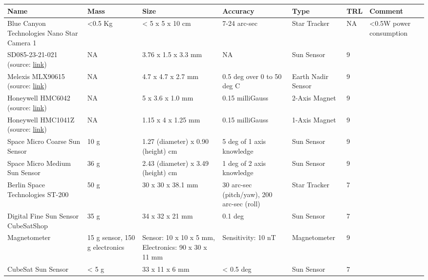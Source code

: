 \begin{center}
     \begin{tabular}{ | p{2.25cm} | p{1.25cm} | p{2cm} | p{2cm} | l | l | p{3.75cm} |}
     \hline

      {\bf Name} & {\bf Mass} & {\bf Size} & {\bf Accuracy} & {\bf Type} & {\bf TRL} & {\bf Comment}  \\ \hline

     Blue Canyon Technologies Nano Star Camera 1 \cite{BCT} & <0.5 Kg& < 5 x 5 x 10 cm & 7-24 arc-sec & Star Tracker & NA & <0.5W power consumption \\ \hline

     SD085-23-21-021 (source: \href{http://www.advancedphotonix.com/ap_products/pdfs/SD085-23-21-021.pdf}{link}) & NA & 3.76 x 1.5 x 3.3 mm & NA & Sun Sensor & 9 & \\ \hline

     Melexis MLX90615 (source: \href{http://goo.gl/7WGMAj}{link}) & NA & 4.7 x 4.7 x 2.7 mm & 0.5 deg over 0 to 50 deg C & Earth Nadir Sensor & 9 &  \\
     \hline

     Honeywell HMC6042 (source: \href{http://www.sssj.co.jp/products/magnetic/pdf/HMC6042.pdf}{link}) & NA & 5 x 3.6 x 1.0 mm & 0.15 milliGauss & 2-Axis Magnet & 9 &   \\ \hline

     Honeywell HMC1041Z (source: \href{http://www51.honeywell.com/aero/common/documents/myaerospacecatalog-documents/Missiles-Munitions/HMC1041Z.pdf}{link}) & NA &1.15 x 4 x 1.25 mm & 0.15 milliGauss & 1-Axis Magnet & 9 &   \\ \hline
     
     Space Micro Coarse Sun Sensor \cite{SMI} &  10 g & 1.27 (diameter) x 0.90 (height) cm & 5 deg of 1 axis knowledge & Sun Sensor & 9 & \\ \hline
     
     Space Micro Medium Sun Sensor \cite{SMI} & 36 g &	2.43 (diameter) x 3.49 (height) cm & 1 deg of 2 axis knowledge & Sun Sensor & 9 & \\ \hline
     
	Berlin Space Technologies ST-200 \cite{BST} & 50 g & 30 x 30 x 38.1 mm & 30 arc-sec (pitch/yaw), 200 arc-sec (roll) & Star Tracker & 7 & \\ \hline

	Digital Fine Sun Sensor CubeSatShop \cite{CubeShop} & 35 g & 34 x 32 x 21 mm & 0.1 deg & Sun Sensor & 7 & \\ \hline
	
	Magnetometer \cite{CubeShop} & 15 g sensor, 150 g electronics & Sensor: 10 x 10 x 5 mm, Electronics: 90 x 30 x 11 mm & Sensitivity: 10 nT & Magnetometer & 9 & \\ \hline
	
	CubeSat Sun Sensor \cite{CubeShop} & < 5 g & 33 x 11 x 6 mm & < 0.5 deg & Sun Sensor & 7 & \\ \hline
	
 	  \hline
     \end{tabular}
\end{center}


